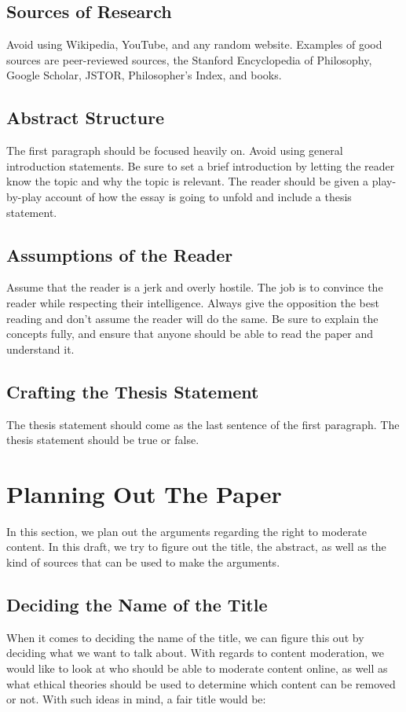 \documentclass[a4paper]{article}
\begin{document}
\subsection{Sources of Research}
Avoid using Wikipedia, YouTube, and any random website. Examples of good sources are peer-reviewed sources, the Stanford 
Encyclopedia of Philosophy, Google Scholar, JSTOR, Philosopher's Index, and books.

\subsection{Abstract Structure}
The first paragraph should be focused heavily on. Avoid using general introduction statements. Be sure to set a brief
introduction by letting the reader know the topic and why the topic is relevant. The reader should be given a 
play-by-play account of how the essay is going to unfold and include a thesis statement. 

\subsection{Assumptions of the Reader}
Assume that the reader is a jerk and overly hostile. The job is to convince the reader while respecting their 
intelligence. Always give the opposition the best reading and don't assume the reader will do the same. Be sure to 
explain the  concepts fully, and ensure that anyone should be able to read the paper and understand it. 

\subsection{Crafting the Thesis Statement}
The thesis statement should come as the last sentence of the first paragraph. The thesis statement should be true or
false. 

\newpage

\section{Planning Out The Paper}
In this section, we plan out the arguments regarding the right to moderate content. In this draft, we try to figure 
out the title, the abstract, as well as the kind of sources that can be used to make the arguments. 

\subsection{Deciding the Name of the Title}
When it comes to deciding the name of the title, we can figure this out by deciding what we want to talk about. With
regards to content moderation, we would like to look at who should be able to moderate content online, as well as what
ethical theories should be used to determine which content can be removed or not. With such ideas in mind, a fair title
would be:  \\
\end{document}
